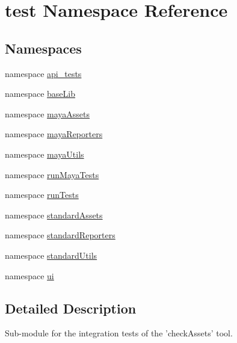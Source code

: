 \hypertarget{namespacetest}{\section{test \-Namespace \-Reference}
\label{df/d04/namespacetest}
}
\subsection*{\-Namespaces}
\begin{DoxyCompactItemize}
\item 
namespace \hyperlink{namespacetest_1_1api__tests}{api\-\_\-tests}
\item 
namespace \hyperlink{namespacetest_1_1baseLib}{base\-Lib}
\item 
namespace \hyperlink{namespacetest_1_1mayaAssets}{maya\-Assets}
\item 
namespace \hyperlink{namespacetest_1_1mayaReporters}{maya\-Reporters}
\item 
namespace \hyperlink{namespacetest_1_1mayaUtils}{maya\-Utils}
\item 
namespace \hyperlink{namespacetest_1_1runMayaTests}{run\-Maya\-Tests}
\item 
namespace \hyperlink{namespacetest_1_1runTests}{run\-Tests}
\item 
namespace \hyperlink{namespacetest_1_1standardAssets}{standard\-Assets}
\item 
namespace \hyperlink{namespacetest_1_1standardReporters}{standard\-Reporters}
\item 
namespace \hyperlink{namespacetest_1_1standardUtils}{standard\-Utils}
\item 
namespace \hyperlink{namespacetest_1_1ui}{ui}
\end{DoxyCompactItemize}


\subsection{\-Detailed \-Description}
\begin{DoxyVerb}
Sub-module for the integration tests of the 'checkAssets' tool.
\end{DoxyVerb}
 